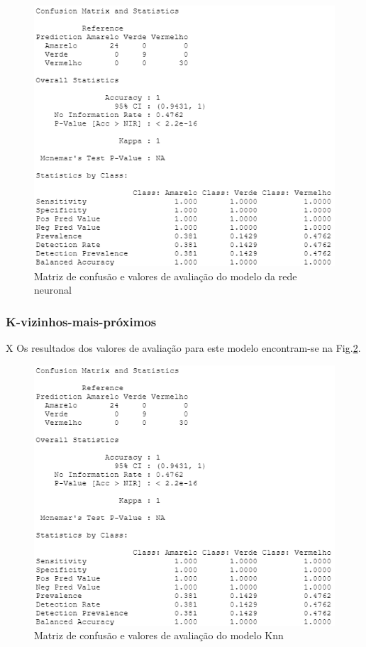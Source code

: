 \documentclass[conference]{IEEEtran}
\begin{document}
\begin{figure}[htbp]
\centerline{\includegraphics[width=0.95\columnwidth]{images/08_4.png}}
\caption{Matriz de confusão e valores de avaliação do modelo da rede neuronal}
\label{8b_confusionmatrix}
\end{figure}


\subsubsection{K-vizinhos-mais-próximos}
X
Os resultados dos valores de avaliação para este modelo encontram-se na Fig.\ref{8c_confusionmatrix}.
\begin{figure}[htbp]
\centerline{\includegraphics[width=0.95\columnwidth]{images/08_5.png}}
\caption{Matriz de confusão e valores de avaliação do modelo Knn}
\label{8c_confusionmatrix}
\end{figure}
\end{document}
